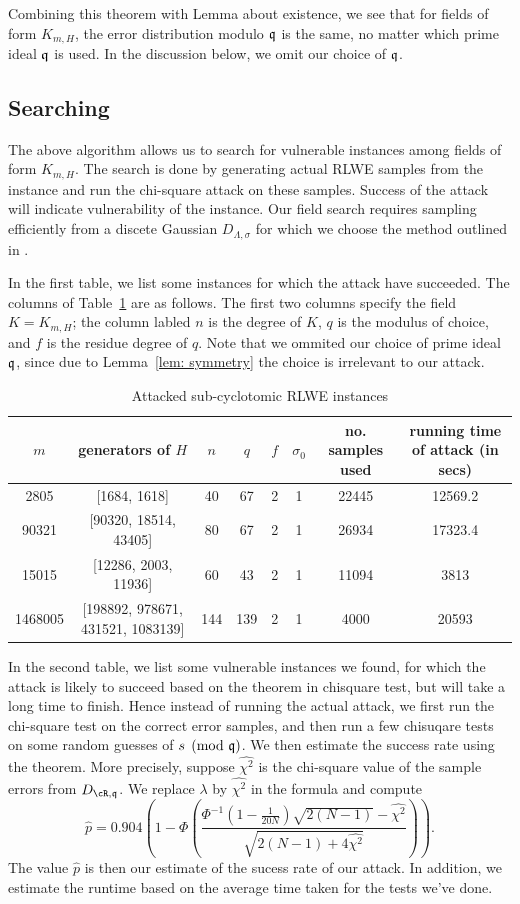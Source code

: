 \documentclass{amsart}
\begin{document}
Combining this theorem with Lemma about existence, we see that for fields of form $K_{m,H}$, the error distribution modulo $\mathfrak{q}$ is the same, no matter which prime ideal $\mathfrak{q}$ is used. In the discussion below, we omit our choice of $\mathfrak{q}$.


\subsection{Searching}

The above algorithm allows us to search for vulnerable instances among fields of form $K_{m,H}$. The search is done by generating actual RLWE samples from the instance and run the chi-square attack on these samples. Success of the attack will indicate vulnerability of the instance. Our field search requires sampling efficiently from a discete Gaussian $D_{\Lambda, \sigma}$ for which we choose the method outlined in \cite{gentry2008trapdoors}.

In the first table, we list some instances for which the attack have succeeded. The columns of Table~\ref{tab: attacked} are as follows. The first two columns specify the field $K = K_{m,H}$; the column labled $n$ is the degree of $K$, $q$ is the modulus of choice, and $f$ is the residue degree of $q$. Note that we ommited our choice of prime ideal $\mathfrak{q}$, since due to Lemma~\ref{lem: symmetry} the choice is irrelevant to our attack.

\begin{table}[H] \label{tab: attacked}
\caption{Attacked sub-cyclotomic RLWE instances}
\begin{tabular}{c|c|c|c|c|c|c|c}
$m$ & generators of $H$ & $n$ & $q$ & $f$ & $\sigma_0$ & no. samples used & running time of attack (in secs) \\ \hline
2805 &  [1684, 1618] & 40 & 67 & 2 & 1 & 22445 & 12569.2 \\
90321 & [90320, 18514, 43405] & 80 & 67 & 2 & 1 & 26934 & 17323.4 \\
15015 & [12286, 2003, 11936] & 60 & 43 & 2 & 1 & 11094 & 3813 \\
1468005 & [198892, 978671, 431521, 1083139] & 144 & 139 & 2 & 1 &  4000 &  20593 \\
\end{tabular}
\end{table}

In the second table, we list some vulnerable instances we found, for which the attack is likely to succeed based on
the theorem in chisquare test, but will take a long time to finish. Hence instead of running the actual attack, we first run the chi-square test on the correct error samples, and then run a few chisuqare tests on some random guesses of $s \pmod{\mathfrak{q}}$. We then estimate the success rate using the theorem. More precisely, suppose $\hat{\chi^2}$ is the chi-square value of the sample errors from $D_{\cR, \fq}$. We replace $\lambda$ by $\hat{\chi^2}$ in the formula and compute
\[
    \hat{p}  = 0.904 \left(1 - \Phi \left(\frac{\Phi^{-1}(1- \frac{1}{20N})\sqrt{2(N-1)}- \hat{\chi^2}}{\sqrt{2(N-1) +4\hat{\chi^2}}}\right)\right).
\]
The value $\hat{p}$ is then our estimate of the sucess rate of our attack.  In addition, we estimate the runtime based on the average time taken for the tests we've done.
\end{document}

